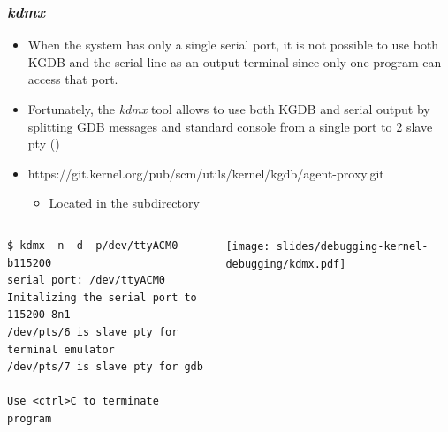 \begin{frame}[fragile]
  \frametitle{{\em kdmx}}
  \begin{itemize}
    \item When the system has only a single serial port, it is not possible to
          use both KGDB and the serial line as an output terminal since only one
          program can access that port.
    \item Fortunately, the {\em kdmx} tool allows to use both KGDB and serial
          output by splitting GDB messages and standard console from a single
          port to 2 slave pty ()
    \item https://git.kernel.org/pub/scm/utils/kernel/kgdb/agent-proxy.git
    \begin{itemize}
      \item Located in the subdirectory 
    \end{itemize}
  \end{itemize}
  \begin{columns}
    \begin{block}{}
      \begin{verbatim}
$ kdmx -n -d -p/dev/ttyACM0 -b115200
serial port: /dev/ttyACM0
Initalizing the serial port to 115200 8n1
/dev/pts/6 is slave pty for terminal emulator
/dev/pts/7 is slave pty for gdb

Use <ctrl>C to terminate program
      \end{verbatim}
    \end{block}
    \texttt{[image: slides/debugging-kernel-debugging/kdmx.pdf]}
  \end{columns}
\end{frame}

